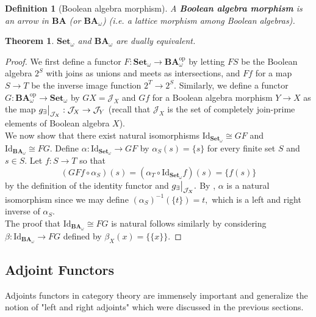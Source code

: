 \documentclass{article}
\newtheorem{theorem}[proposition]{Theorem}
\newtheorem{definition}[proposition]{Definition}
\numberwithin{equation}{section}
\newcommand{\cat}[1]{{\mathbf{#1}}}
\newcommand{\Id}{\mathrm{Id}}
\newcommand{\op}{\mathrm{op}}
\newcommand\restr[2]{{%
  \left.\kern-\nulldelimiterspace %
  #1 %
  \vphantom{\big|} %
  \right|_{#2} %
}}
\begin{document}
\begin{definition}[Boolean algebra morphism]
A \textbf{Boolean algebra morphism} is an arrow in $\cat{BA}$ (or $\cat{BA}_\omega$) (i.e. a lattice morphism among Boolean algebras).
\end{definition}

\begin{theorem}
\label{thm:fin-ba-set-duality-cat-theoretic}
$\cat{Set}_\omega$ and $\cat{BA}_\omega$ are dually equivalent.
\end{theorem}

\begin{proof}
We first define a functor $F : \cat{Set}_\omega \to \cat{BA}^\op_\omega$ by letting $FS$ be the Boolean algebra $2^S$ with joins as unions and meets as intersections, and $Ff$ for a map $S \to T$ be the inverse image function $2^T \to 2^S.$ Similarly, we define a functor $G : \cat{BA}^\op_\omega \to \cat{Set}_\omega$ by $GX = \mathcal{J}_X$ and $Gf$ for a Boolean algebra morphism $Y \to X$ as the map $\restr{g_\exists}{\mathcal{J}_X} : \mathcal{J}_X \to \mathcal{J}_Y$ (recall that $\mathcal{J}_X$ is the set of completely join-prime elements of Boolean algebra $X$). \\ 

We now show that there exist natural isomorphisms $\Id_{\cat{Set}_\omega} \cong GF$ and $\Id_{\cat{BA}_\omega} \cong FG.$ Define $\alpha : \Id_{\cat{Set}_\omega} \to GF$ by $\alpha_S(s) = \{s\}$ for every finite set $S$ and $s \in S.$ Let $f : S \to T$ so that $$(GFf \circ \alpha_S)(s) = (\alpha_T \circ \Id_{\cat{Set}_\omega}f)(s) = \{f(s)\}$$ by the definition of the identity functor and $\restr{g_\exists}{\mathcal{J}_X}.$ By , $\alpha$ is a natural isomorphism since we may define $(\alpha_S)^{-1}(\{t\}) = t,$ which is a left and right inverse of $\alpha_S.$ \\ 

The proof that $\Id_{\cat{BA}_\omega} \cong FG$ is natural follows similarly by considering $\beta : \Id_{\cat{BA}_\omega} \to FG$ defined by $\beta_X(x) = \{\{x\}\}.$
\end{proof}

\subsection{Adjoint Functors}

Adjoints functors in category theory are immensely important and generalize the notion of "left and right adjoints" which were discussed in the previous sections. 
\end{document}
